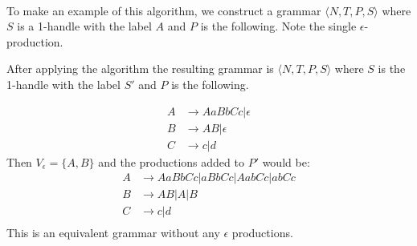 \paragraph{}

To make an example of this algorithm, we construct a grammar $\langle N, T, P, S \rangle$ where $S$ is a 1-handle with the label $A$ and $P$ is the following. Note the single $\epsilon$-production.


After applying the algorithm the resulting grammar is $\langle N, T, P, S \rangle$ where $S$ is the 1-handle with the label $S'$ and $P$ is the following.


\begin{align*}
A &\to AaBbCc | \epsilon \\
B &\to AB | \epsilon \\
C &\to c | d
\end{align*}
Then $V_\epsilon = \{A, B\}$ and the productions added to $P'$ would be:
\begin{align*}
A &\to AaBbCc | aBbCc | AabCc | abCc \\
B &\to AB | A | B \\
C &\to c | d \\
\end{align*}
This is an equivalent grammar without any $\epsilon$ productions.



